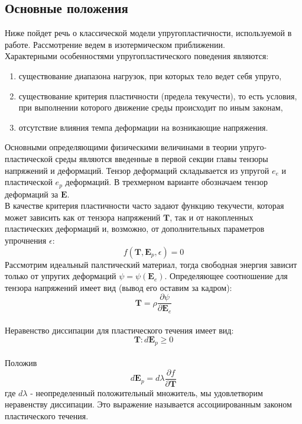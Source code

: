 \documentclass[12pt,a4paper, titlepage, openany]{book}
\begin{document}
\subsection*{Основные положения}
Ниже пойдет речь о классической модели упругопластичности, используемой в работе. Рассмотрение ведем в изотермическом приближении.
\\
Характерными особенностями упругопластического поведения являются:
\begin{enumerate}
\item существование диапазона нагрузок, при которых тело ведет себя упруго,
\item существование критерия пластичности (предела текучести), то есть условия, при выполнении которого движение среды происходит по иным законам,
\item отсутствие влияния темпа деформации на возникающие напряжения.
\end{enumerate}
Основными определяющими физическими величинами в теории упруго-пластической среды являются введенные в первой секции главы тензоры напряжений и деформаций. Тензор деформаций складывается из упругой $e_e$ и пластической $e_p$ деформаций. В трехмерном варианте обозначаем тензор деформаций за $\mathbf{E}$.
\\
В качестве критерия пластичности часто задают функцию текучести, которая может зависить как от тензора напряжений $\mathbf{T}$, так и от накопленных пластических деформаций и, возможно, от дополнительных параметров упрочнения $\epsilon$:
\begin{equation}
f(\mathbf{T}, \mathbf{E}_p, \epsilon) = 0
\end{equation}
Рассмотрим идеальный палстический материал, тогда свободная энергия зависит только от упругих деформаций $\psi = \psi(\mathbf{E}_e)$. Определяющее соотношение для тензора напряжений имеет вид (вывод его оставим за кадром):
\begin{equation}
\mathbf{T} = \rho \frac{\partial \psi}{\partial \mathbf{E}_e}
\end{equation}
\\
Неравенство диссипации для пластического течения имеет вид:
\begin{equation}
\mathbf{T}:d\mathbf{E}_p \geq 0
\end{equation}
\\
Положив
\begin{equation}
d\mathbf{E}_p = d \lambda \frac{\partial f}{\partial \mathbf{T}}
\end{equation}
где $d \lambda$ - неопределенный положительный множитель, мы удовлетворим неравенству диссипации. Это выражение называется ассоциированным законом пластического течения.
\\
\end{document}
